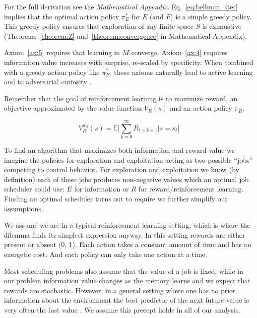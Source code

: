 \documentclass[12pt]{article}
\begin{document}
For the full derivation see the \textit{Mathematical Appendix}. Eq.~\ref{eq:bellman_iter} implies that the optimal action policy $\pi^*_E$ for $E$ (and $F$) is a simple greedy policy. This greedy policy ensures that exploration of any finite space $S$ is exhaustive (Theorems~\ref{theorem:Z} and~\ref{theorem:convergence} in Mathematical Appendix).

Axiom~\ref{ax:5} requires that learning in $M$ converge. Axiom~\ref{ax:4} requires information value increases with surprise, re-scaled by specificity. When combined with a greedy action policy like $\pi^*_E$, these axioms naturally lead to active learning \cite{Shyam2018,Pathak2019,Schwartenbeck2019} and to adversarial curiosity \cite{Schmidhuber2019a}.

Remember that the goal of reinforcement learning is to maximize reward, an objective approximated by the value function $V_R(s)$ and an action policy $\pi_R$. 

\begin{equation}\label{eq:V_R} 
	V^{\pi_R}_R(s) = \mathbb{E} \Big [ \sum_{k=0}^{\infty} R_{t+k+1} \big | s = s_t \Big ] 
\end{equation}

To find an algorithm that maximizes both information and reward value we imagine the policies for exploration and exploitation acting as two possible ``jobs'' competing to control behavior. For exploration and exploitation we know (by definition) each of these jobs produces non-negative values which an optimal job scheduler could use: $E$ for information or $R$ for reward/reinforcement learning. Finding an optimal scheduler turns out to require we further simplify our assumptions. 

We assume we are in a typical reinforcement learning setting, which is where the dilemma finds its simplest expression anyway. In this setting rewards are either present or absent (0, 1). Each action takes a constant amount of time and has no energetic cost. And each policy can only take one action at a time. 

Most scheduling problems also assume that the value of a job is fixed, while in our problem information value changes as the memory learns and we expect that rewards are stochastic. However, in a general setting where one has no prior information about the environment the best predictor of the next future value is very often the last value \cite{Hocker2019,Roughgarden2019}. We assume this precept holds in all of our analysis.
\end{document}
